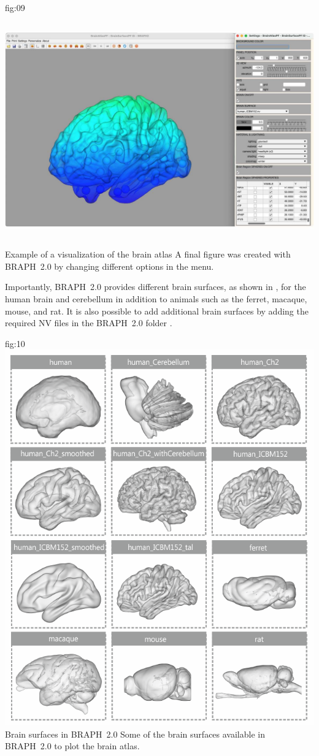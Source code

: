 \documentclass[justified]{tufte-handout}
\begin{document}
	{fig:09}
	{\includegraphics[height=10cm]{fig09.jpg}}
	{Example of a visualization of the brain atlas}
	{
	A final figure was created with BRAPH~2.0 by changing different options in the menu.
	}

Importantly, BRAPH~2.0 provides different brain surfaces, as shown in , for the human brain and cerebellum in addition to animals such as the ferret, macaque, mouse, and rat.
It is also possible to add additional brain surfaces by adding the required NV files in the BRAPH~2.0 folder .

	{fig:10}
	{\includegraphics{fig10.png}}
	{Brain surfaces in BRAPH~2.0}
	{
	Some of the brain surfaces available in BRAPH~2.0 to plot the brain atlas.
	}
\end{document}
